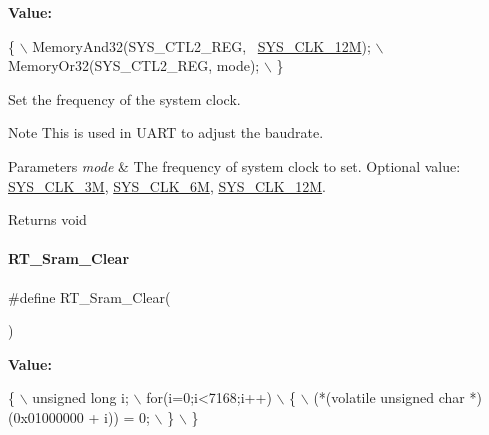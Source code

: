 {\bfseries Value\+:}
\begin{DoxyCode}
\{                                               \(\backslash\)
    MemoryAnd32(SYS\_CTL2\_REG, ~\mbox{\hyperlink{a00020_ae3a2d501b8662e11b969fb4a5e195e5ba6c646c9a1e4c38ef0af6d576eacfb401}{SYS\_CLK\_12M}});    \(\backslash\)
    MemoryOr32(SYS\_CTL2\_REG, mode);             \(\backslash\)
\}
\end{DoxyCode}


Set the frequency of the system clock. 

\begin{DoxyNote}{Note}
This is used in U\+A\+RT to adjust the baudrate. 
\end{DoxyNote}

\begin{DoxyParams}{Parameters}
{\em mode} & The frequency of system clock to set. Optional value\+: \mbox{\hyperlink{a00020_ae3a2d501b8662e11b969fb4a5e195e5baaac7754daa9ff2db35951f3539495122}{S\+Y\+S\+\_\+\+C\+L\+K\+\_\+3M}}, \mbox{\hyperlink{a00020_ae3a2d501b8662e11b969fb4a5e195e5bad1640aa8c46162a7551abca12293ef39}{S\+Y\+S\+\_\+\+C\+L\+K\+\_\+6M}}, \mbox{\hyperlink{a00020_ae3a2d501b8662e11b969fb4a5e195e5ba6c646c9a1e4c38ef0af6d576eacfb401}{S\+Y\+S\+\_\+\+C\+L\+K\+\_\+12M}}. \\
\hline
\end{DoxyParams}
\begin{DoxyReturn}{Returns}
void 
\end{DoxyReturn}
\mbox{\label{a00020_ae64bbc76e9536602350b7ec801d010c1}} 
\paragraph{\texorpdfstring{R\+T\+\_\+\+Sram\+\_\+\+Clear}{RT\_Sram\_Clear}}
{\footnotesize\ttfamily \#define R\+T\+\_\+\+Sram\+\_\+\+Clear(\begin{DoxyParamCaption}{ }\end{DoxyParamCaption})}

{\bfseries Value\+:}
\begin{DoxyCode}
\{                                                           \(\backslash\)
    unsigned \textcolor{keywordtype}{long} i;                                        \(\backslash\)
    for(i=0;i<7168;i++)                                     \(\backslash\)
    \{                                                       \(\backslash\)
      (*(\textcolor{keyword}{volatile} \textcolor{keywordtype}{unsigned} \textcolor{keywordtype}{char} *)(0x01000000 + i)) = 0;    \(\backslash\)
    \}                                                       \(\backslash\)
\}
\end{DoxyCode}


